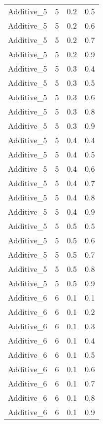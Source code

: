 \documentclass{article}
\begin{document}
\begin{longtable}[H]{lrrr}
 Additive\_5 &       5 &   0.2 &            0.5 \\
 Additive\_5 &       5 &   0.2 &            0.6 \\
 Additive\_5 &       5 &   0.2 &            0.7 \\
 Additive\_5 &       5 &   0.2 &            0.9 \\
 Additive\_5 &       5 &   0.3 &            0.4 \\
 Additive\_5 &       5 &   0.3 &            0.5 \\
 Additive\_5 &       5 &   0.3 &            0.6 \\
 Additive\_5 &       5 &   0.3 &            0.8 \\
 Additive\_5 &       5 &   0.3 &            0.9 \\
 Additive\_5 &       5 &   0.4 &            0.4 \\
 Additive\_5 &       5 &   0.4 &            0.5 \\
 Additive\_5 &       5 &   0.4 &            0.6 \\
 Additive\_5 &       5 &   0.4 &            0.7 \\
 Additive\_5 &       5 &   0.4 &            0.8 \\
 Additive\_5 &       5 &   0.4 &            0.9 \\
 Additive\_5 &       5 &   0.5 &            0.5 \\
 Additive\_5 &       5 &   0.5 &            0.6 \\
 Additive\_5 &       5 &   0.5 &            0.7 \\
 Additive\_5 &       5 &   0.5 &            0.8 \\
 Additive\_5 &       5 &   0.5 &            0.9 \\
 Additive\_6 &       6 &   0.1 &            0.1 \\
 Additive\_6 &       6 &   0.1 &            0.2 \\
 Additive\_6 &       6 &   0.1 &            0.3 \\
 Additive\_6 &       6 &   0.1 &            0.4 \\
 Additive\_6 &       6 &   0.1 &            0.5 \\
 Additive\_6 &       6 &   0.1 &            0.6 \\
 Additive\_6 &       6 &   0.1 &            0.7 \\
 Additive\_6 &       6 &   0.1 &            0.8 \\
 Additive\_6 &       6 &   0.1 &            0.9 \\

\end{longtable}
\end{document}
